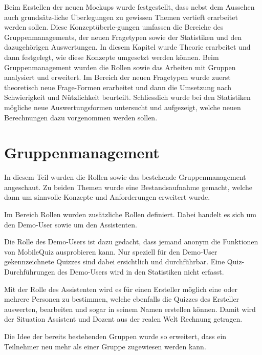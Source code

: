 


Beim Erstellen der neuen Mockups wurde festgestellt, dass nebst dem Aussehen auch grundsätz-liche Überlegungen zu gewissen Themen vertieft erarbeitet werden sollen. Diese Konzeptüberle-gungen umfassen die Bereiche des Gruppenmanagements, der neuen Fragetypen sowie der Statistiken und den dazugehörigen Auswertungen.
In diesem Kapitel wurde Theorie erarbeitet und dann festgelegt, wie diese Konzepte umgesetzt werden können. Beim Gruppenmanagement wurden die Rollen sowie das Arbeiten mit Gruppen analysiert und erweitert. Im Bereich der neuen Fragetypen wurde zuerst theoretisch neue Frage-Formen erarbeitet und dann die Umsetzung nach Schwierigkeit und Nützlichkeit beurteilt. Schliesslich wurde bei den Statistiken mögliche neue Auswertungsformen untersucht und aufgezeigt, welche neuen Berechnungen dazu vorgenommen werden sollen.

\section{Gruppenmanagement}
In diesem Teil wurden die Rollen sowie das bestehende Gruppenmanagement angeschaut. Zu beiden Themen wurde eine Bestandsaufnahme gemacht, welche dann um sinnvolle Konzepte und Anforderungen erweitert wurde.

\bigskip

Im Bereich Rollen wurden zusätzliche Rollen definiert. Dabei handelt es sich um den Demo-User sowie um den Assistenten.

Die Rolle des Demo-Users ist dazu gedacht, dass jemand anonym die Funktionen von MobileQuiz ausprobieren kann. Nur speziell für den Demo-User gekennzeichnete Quizzes sind dabei ersichtlich und durchführbar. Eine Quiz-Durchführungen des Demo-Users wird in den Statistiken nicht erfasst.

Mit der Rolle des Assistenten wird es für einen Ersteller möglich eine oder mehrere Personen zu bestimmen, welche ebenfalls die Quizzes des Ersteller auswerten, bearbeiten und sogar in seinem Namen erstellen können. Damit wird der Situation Assistent und Dozent aus der realen Welt Rechnung getragen.

\bigskip

Die Idee der bereits bestehenden Gruppen wurde so erweitert, dass ein Teilnehmer neu mehr als einer Gruppe zugewiesen werden kann.

